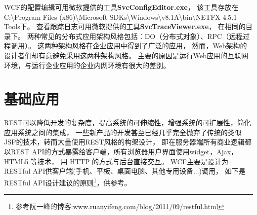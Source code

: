 \documentclass{book}
\begin{document}
WCF的配置编辑可用微软提供的工具\textbf{SvcConfigEditor.exe}，
该工具存放在C:\textbackslash Program Files (x86)\textbackslash Microsoft SDKs\textbackslash Windows\textbackslash v8.1A\textbackslash bin\textbackslash NETFX 4.5.1 Tools下。
查看跟踪日志可用微软提供的工具\textbf{SvcTraceViewer.exe}，
在相同的目录下。
两种常见的分布式应用架构风格包括：DO（分布式对象）、RPC（远程过程调用）。
这两种架构风格在企业应用中得到了广泛的应用，
然而，Web架构的设计者们却有意避免采用这两种架构风格。
主要的原因是运行Web应用的互联网环境，与运行企业应用的企业内网环境有很大的差别。 

\section{基础应用}

REST可以降低开发的复杂度，提高系统的可伸缩性，增强系统的可扩展性，简化应用系统之间的集成，
一些新产品的开发甚至已经几乎完全抛弃了传统的类似JSP的技术，转而大量使用REST风格的构架设计， 即在服务器端所有商业逻辑都以REST API的方式暴露给客户端，所有浏览器用户界面使用widget，Ajax，HTML5 等技术，
用 HTTP 的方式与后台直接交互。
WCF主要是设计为RESTful API供客户端(手机、平板、桌面电脑、其他专用设备...)调用，
如下是RESTful API设计建议的原则\footnote{参考阮一峰的博客:www.ruanyifeng.com/blog/2011/09/restful.html}，供参考。
\end{document}
